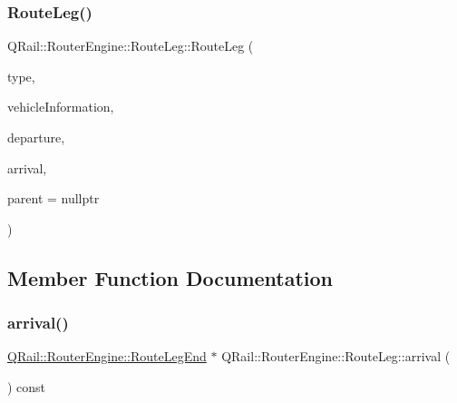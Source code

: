 \subsubsection{\texorpdfstring{RouteLeg()}{RouteLeg()}}
{\footnotesize\ttfamily Q\+Rail\+::\+Router\+Engine\+::\+Route\+Leg\+::\+Route\+Leg (\begin{DoxyParamCaption}\item[{const \mbox{\hyperlink{classQRail_1_1RouterEngine_1_1RouteLeg_af31dfcc23f2ae80f7fb0feca24cb9816}{Q\+Rail\+::\+Router\+Engine\+::\+Route\+Leg\+::\+Type}} \&}]{type,  }\item[{\mbox{\hyperlink{classQRail_1_1VehicleEngine_1_1Vehicle}{Q\+Rail\+::\+Vehicle\+Engine\+::\+Vehicle}} $\ast$}]{vehicle\+Information,  }\item[{\mbox{\hyperlink{classQRail_1_1RouterEngine_1_1RouteLegEnd}{Q\+Rail\+::\+Router\+Engine\+::\+Route\+Leg\+End}} $\ast$}]{departure,  }\item[{\mbox{\hyperlink{classQRail_1_1RouterEngine_1_1RouteLegEnd}{Q\+Rail\+::\+Router\+Engine\+::\+Route\+Leg\+End}} $\ast$}]{arrival,  }\item[{Q\+Object $\ast$}]{parent = {\ttfamily nullptr} }\end{DoxyParamCaption})\hspace{0.3cm}{\ttfamily [explicit]}}



\subsection{Member Function Documentation}
\mbox{\label{classQRail_1_1RouterEngine_1_1RouteLeg_a64234d433c30c991555722de85094d17}} 
\subsubsection{\texorpdfstring{arrival()}{arrival()}}
{\footnotesize\ttfamily \mbox{\hyperlink{classQRail_1_1RouterEngine_1_1RouteLegEnd}{Q\+Rail\+::\+Router\+Engine\+::\+Route\+Leg\+End}} $\ast$ Q\+Rail\+::\+Router\+Engine\+::\+Route\+Leg\+::arrival (\begin{DoxyParamCaption}{ }\end{DoxyParamCaption}) const}

\mbox{\label{classQRail_1_1RouterEngine_1_1RouteLeg_a6364bb0f1f809f1e354d5a97d72dfee8}} 
